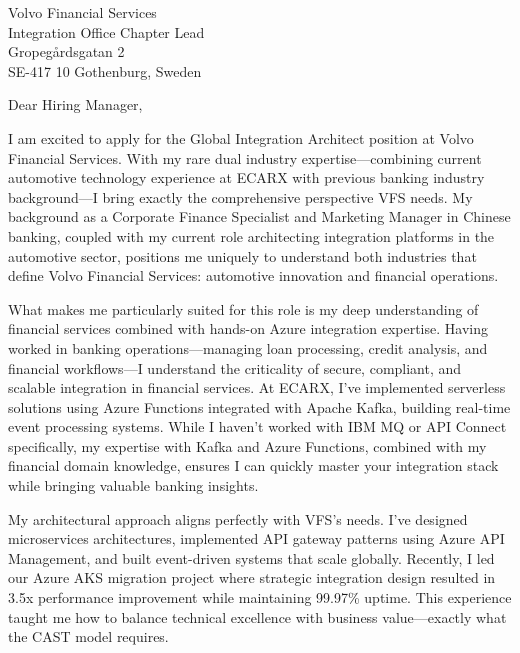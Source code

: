 \documentclass[a4paper,10pt]{article}
\begin{document}
\pagestyle{empty} %

\begin{letter}{\color{darkblue}
Volvo Financial Services\\
Integration Office Chapter Lead\\
Gropegårdsgatan 2\\
SE-417 10 Gothenburg, Sweden}

\vspace{30pt}

\opening{Dear Hiring Manager,}

\vspace{8pt}

I am excited to apply for the Global Integration Architect position at Volvo Financial Services. With my rare dual industry expertise—combining current automotive technology experience at ECARX with previous banking industry background—I bring exactly the comprehensive perspective VFS needs. My background as a Corporate Finance Specialist and Marketing Manager in Chinese banking, coupled with my current role architecting integration platforms in the automotive sector, positions me uniquely to understand both industries that define Volvo Financial Services: automotive innovation and financial operations.

What makes me particularly suited for this role is my deep understanding of financial services combined with hands-on Azure integration expertise. Having worked in banking operations—managing loan processing, credit analysis, and financial workflows—I understand the criticality of secure, compliant, and scalable integration in financial services. At ECARX, I've implemented serverless solutions using Azure Functions integrated with Apache Kafka, building real-time event processing systems. While I haven't worked with IBM MQ or API Connect specifically, my expertise with Kafka and Azure Functions, combined with my financial domain knowledge, ensures I can quickly master your integration stack while bringing valuable banking insights.

My architectural approach aligns perfectly with VFS's needs. I've designed microservices architectures, implemented API gateway patterns using Azure API Management, and built event-driven systems that scale globally. Recently, I led our Azure AKS migration project where strategic integration design resulted in 3.5x performance improvement while maintaining 99.97\% uptime. This experience taught me how to balance technical excellence with business value—exactly what the CAST model requires.


\end{letter}
\end{document}

